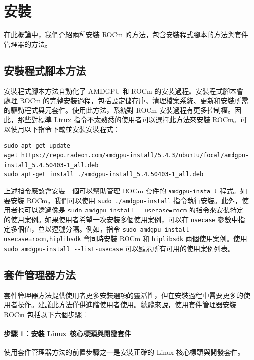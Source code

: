 \section{安裝}

在此概論中，我們介紹兩種安裝 ROCm 的方法，包含安裝程式腳本的方法與套件管理器的方法。

\subsection{安裝程式腳本方法}
\label{sec:rocm_installer_method}
安裝程式腳本方法自動化了 AMDGPU 和 ROCm 的安裝過程。安裝程式腳本會處理 ROCm 的完整安裝過程，包括設定儲存庫、清理檔案系統、更新和安裝所需的驅動程式與元套件。使用此方法，系統對 ROCm 安裝過程有更多控制權。因此，那些對標準 Linux 指令不太熟悉的使用者可以選擇此方法來安裝 ROCm。可以使用以下指令下載並安裝安裝程式：

\begin{lstlisting}[caption={使用安裝程式腳本安裝 ROCm 所需指令}, label={lst:a1}]
sudo apt-get update
wget https://repo.radeon.com/amdgpu-install/5.4.3/ubuntu/focal/amdgpu-install_5.4.50403-1_all.deb
sudo apt-get install ./amdgpu-install_5.4.50403-1_all.deb
\end{lstlisting}

上述指令應該會安裝一個可以幫助管理 ROCm 套件的 \lstinline|amdgpu-install| 程式。如要安裝 ROCm，我們可以使用 \lstinline|sudo ./amdgpu-install| 指令執行安裝。此外，使用者也可以透過像是 \lstinline|sudo amdgpu-install --usecase=rocm| 的指令來安裝特定的使用案例。如果使用者希望一次安裝多個使用案例，可以在 \lstinline|usecase| 參數中指定多個值，並以逗號分隔。例如，指令 \lstinline|sudo amdgpu-install --usecase=rocm,hiplibsdk| 會同時安裝 ROCm 和 \lstinline|hiplibsdk| 兩個使用案例。使用 \lstinline|sudo amdgpu-install --list-usecase| 可以顯示所有可用的使用案例列表。


\subsection{套件管理器方法}

套件管理器方法提供使用者更多安裝選項的靈活性，但在安裝過程中需要更多的使用者操作。建議此方法僅供進階使用者使用。總體來說，使用套件管理器安裝 ROCm 包括以下六個步驟：

\paragraph{步驟 1：安裝 Linux 核心標頭與開發套件}
使用套件管理器方法的前置步驟之一是安裝正確的 Linux 核心標頭與開發套件。

